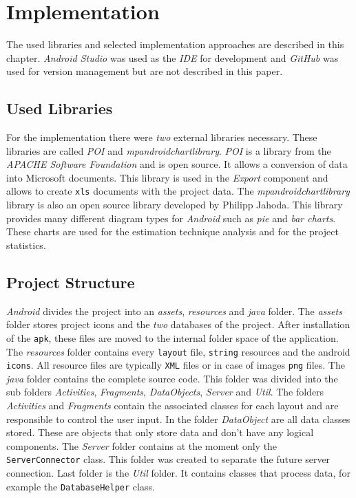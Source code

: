 \chapter{Implementation}

The used libraries and selected implementation approaches are described in this chapter. \textit{Android Studio} was used as the \textit{IDE} for development and \textit{GitHub} was used for version management but are not described in this paper.

\section{Used Libraries}

For the implementation there were \textit{two} external libraries necessary. These libraries are called \textit{POI} and \textit{mpandroidchartlibrary}. \textit{POI} is a library from the \textit{APACHE Software Foundation} and is open source. It allows a conversion of data into Microsoft documents. This library is used
in the \textit{Export} component and allows to create \texttt{xls} documents with the project data. The \textit{mpandroidchartlibrary} library is also an open source library developed by Philipp Jahoda. This library provides many different diagram types for \textit{Android} such as \textit{pie} and \textit{bar charts}. These charts are used for the estimation technique analysis and for the project statistics. 

\section{Project Structure}

\textit{Android} divides the project into an \textit{assets}, \textit{resources} and \textit{java} folder. The \textit{assets} folder stores project icons and the \textit{two} databases of the project. After installation of the \texttt{apk}, these files are moved to the internal folder space of the application. The \textit{resources} folder contains every \texttt{layout} file, \texttt{string} resources and the android \texttt{icons}. All resource files are typically \texttt{XML} files or in case of images \texttt{png} files. The \textit{java} folder contains the complete source code. This folder was divided into the sub folders \textit{Activities}, \textit{Fragments}, \textit{DataObjects}, \textit{Server} and \textit{Util}. The folders \textit{Activities} and \textit{Fragments} contain the associated classes for each layout and are responsible to control the user input. In the folder \textit{DataObject} are all data classes stored. These are objects that only store data and don't have any logical components. The \textit{Server} folder contains at the moment only the \texttt{ServerConnector} class. This folder was created to separate the future server connection. Last folder is the \textit{Util} folder. It contains classes that process data, for example the \texttt{DatabaseHelper} class.

